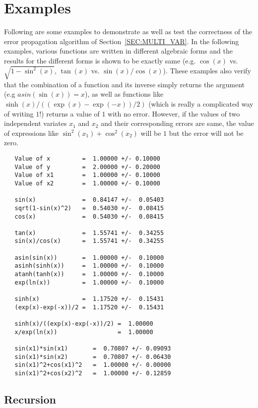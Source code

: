 \documentclass[11pt]{article}
\begin{document}
\section{Examples}
\label{SEC:EXAMPLES}
Following are some examples to demonstrate as well as test the
correctness of the error propagation algorithm of
Section~\ref{SEC:MULTI_VAR}.  In the following examples, various
functions are written in different algebraic forms and the results for
the different forms is shown to be exactly same (e.g. $\cos(x)$ vs.
$\sqrt{1-\sin^2(x)}$, $\tan(x)$ vs. $\sin(x)/\cos(x)$).  These
examples also verify that the combination of a function and its
inverse simply returns the argument (e.g $asin(\sin(x))=x$), as well
as functions like $\sinh(x)/((\exp(x)-\exp(-x))/2)$ (which is really a
complicated way of writing $1$!) returns a value of $1$ with no error.
However, if the values of two independent variates $x_1$ and $x_2$ and
their corresponding errors are same, the value of expressions like
$\sin^2(x_1) + \cos^2(x_2)$ will be $1$ but the error will not be zero.
\begin{verbatim}
   Value of x         =  1.00000 +/- 0.10000
   Value of y         =  2.00000 +/- 0.20000
   Value of x1        =  1.00000 +/- 0.10000
   Value of x2        =  1.00000 +/- 0.10000

   sin(x)             =  0.84147 +/-  0.05403
   sqrt(1-sin(x)^2)   =  0.54030 +/-  0.08415
   cos(x)             =  0.54030 +/-  0.08415

   tan(x)             =  1.55741 +/-  0.34255
   sin(x)/cos(x)      =  1.55741 +/-  0.34255

   asin(sin(x))       =  1.00000 +/-  0.10000
   asinh(sinh(x))     =  1.00000 +/-  0.10000
   atanh(tanh(x))     =  1.00000 +/-  0.10000
   exp(ln(x))         =  1.00000 +/-  0.10000

   sinh(x)            =  1.17520 +/-  0.15431
   (exp(x)-exp(-x))/2 =  1.17520 +/-  0.15431

   sinh(x)/((exp(x)-exp(-x))/2) =  1.00000
   x/exp(ln(x))                 =  1.00000

   sin(x1)*sin(x1)       =  0.70807 +/- 0.09093
   sin(x1)*sin(x2)       =  0.70807 +/- 0.06430
   sin(x1)^2+cos(x1)^2   =  1.00000 +/- 0.00000
   sin(x1)^2+cos(x2)^2   =  1.00000 +/- 0.12859
\end{verbatim}

\subsection{Recursion}
\end{document}
